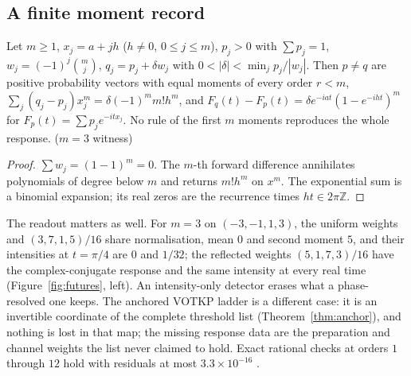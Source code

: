 \subsection{A finite moment record}
\begin{theorem}\label{thm:moments}
Let $m\ge1$, $x_j=a+jh$ ($h\neq0$, $0\le j\le m$), $p_j>0$ with $\sum p_j=1$, $w_j=(-1)^j\binom mj$, $q_j=p_j+\delta w_j$ with $0<|\delta|<\min_jp_j/|w_j|$. Then $p\neq q$ are positive probability vectors with equal moments of every order $r<m$, $\sum_j(q_j-p_j)x_j^m=\delta(-1)^mm!h^m$, and $F_q(t)-F_p(t)=\delta e^{-iat}(1-e^{-iht})^m$ for $F_p(t)=\sum p_je^{-itx_j}$. No rule of the first $m$ moments reproduces the whole response. ($m=3$ witness)
\end{theorem}
\begin{proof}
$\sum w_j=(1-1)^m=0$. The $m$-th forward difference annihilates polynomials of degree below $m$ and returns $m!h^m$ on $x^m$. The exponential sum is a binomial expansion; its real zeros are the recurrence times $ht\in2\pi\mathbb Z$.
\end{proof}
The readout matters as well. For $m=3$ on $(-3,-1,1,3)$, the uniform weights and $(3,7,1,5)/16$ share normalisation, mean $0$ and second moment $5$, and their intensities at $t=\pi/4$ are $0$ and $1/32$; the reflected weights $(5,1,7,3)/16$ have the complex-conjugate response and the same intensity at every real time (Figure~\ref{fig:futures}, left). An intensity-only detector erases what a phase-resolved one keeps. The anchored VOTKP ladder is a different case: it is an invertible coordinate of the complete threshold list (Theorem~\ref{thm:anchor}), and nothing is lost in that map; the missing response data are the preparation and channel weights the list never claimed to hold. Exact rational checks at orders $1$ through $12$ hold with residuals at most $3.3\times10^{-16}$ .

